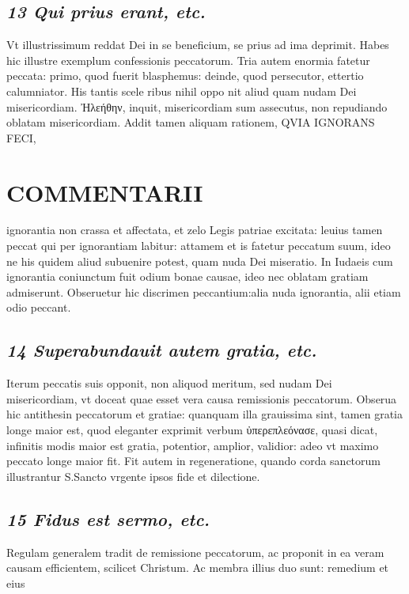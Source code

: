 \documentclass{article}
\begin{document}
\begin{pages}
\subsection*{\textit{13 Qui prius erant, etc. }}\pstart Vt illustrissimum reddat Dei in se beneficium, se prius ad ima deprimit. Habes hic illustre exemplum confessionis peccatorum. Tria autem enormia fatetur peccata: primo, quod fuerit blasphemus: deinde, quod persecutor, ettertio calumniator. His tantis scele ribus nihil oppo nit aliud quam nudam Dei misericordiam. Ἠλεήθην, inquit, misericordiam sum assecutus, non repudiando oblatam misericordiam. Addit tamen aliquam rationem, QVIA IGNORANS FECI,  \pend
\section*{COMMENTARII }
\marginpar{[ p.32 ]}\pstart ignorantia non crassa et affectata, et zelo Legis patriae excitata: leuius tamen peccat qui per ignorantiam labitur: attamem et is fatetur peccatum suum, ideo ne his quidem aliud subuenire potest, quam nuda Dei miseratio. In Iudaeis cum ignorantia coniunctum fuit odium bonae causae, ideo nec oblatam gratiam admiserunt. Obseruetur hic discrimen peccantium:alia nuda ignorantia, alii etiam odio peccant.  \pend
{}
{}
\subsection*{\textit{14 Superabundauit autem gratia, etc. }}\pstart Iterum peccatis suis opponit, non aliquod meritum, sed nudam Dei misericordiam, vt doceat quae esset vera causa remissionis peccatorum. Obserua hic antithesin peccatorum et gratiae: quanquam illa grauissima sint, tamen gratia longe maior est, quod eleganter exprimit verbum ὐπερεπλεόνασε, quasi dicat, infinitis modis maior est gratia, potentior, amplior, validior: adeo vt maximo peccato longe maior fit. Fit autem in regeneratione, quando corda sanctorum illustrantur S.Sancto vrgente ipsos fide et dilectione.  \pend
{}
{}
\subsection*{\textit{15 Fidus est sermo, etc. }}\pstart Regulam generalem tradit de remissione peccatorum, ac proponit in ea veram causam efficientem, scilicet Christum. Ac membra illius duo sunt: remedium et eius  \pend

\end{pages}
\end{document}
